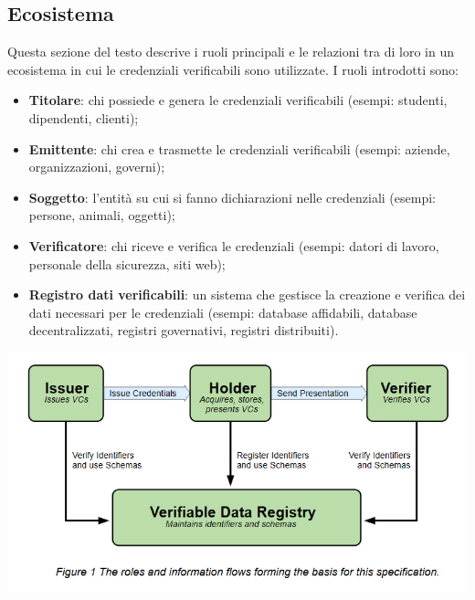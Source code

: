 \subsection{Ecosistema}
Questa sezione del testo descrive i ruoli principali e le relazioni tra di loro in un ecosistema in cui le credenziali verificabili sono utilizzate. I ruoli introdotti sono:
\begin{itemize}
\item \textbf{Titolare}: chi possiede e genera le credenziali verificabili (esempi: studenti, dipendenti, clienti);\\
\item \textbf{Emittente}: chi crea e trasmette le credenziali verificabili (esempi: aziende, organizzazioni, governi);\\
\item \textbf{Soggetto}: l'entità su cui si fanno dichiarazioni nelle credenziali (esempi: persone, animali, oggetti);\\
\item \textbf{Verificatore}: chi riceve e verifica le credenziali (esempi: datori di lavoro, personale della sicurezza, siti web);\\
\item \textbf{Registro dati verificabili}: un sistema che gestisce la creazione e verifica dei dati necessari per le credenziali (esempi: database affidabili, database decentralizzati, 
registri governativi, registri distribuiti).\\
\end{itemize}
\begin{center}
	\includegraphics[scale = 1]{./res/images/Immaginew3c2.png}
\end{center}

